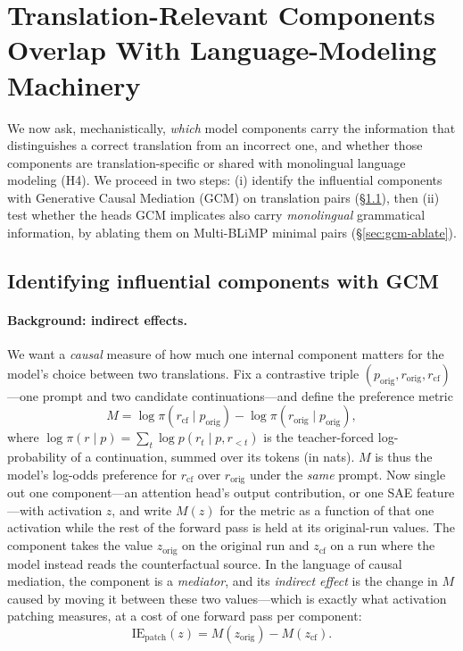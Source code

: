 \documentclass[11pt]{article}
\begin{document}
\section{Translation-Relevant Components Overlap With Language-Modeling Machinery}
\label{sec:gcm}

We now ask, mechanistically, \emph{which} model components carry the information
that distinguishes a correct translation from an incorrect one, and whether
those components are translation-specific or shared with monolingual language
modeling (H4). We proceed in two steps: (i) identify the influential components
with Generative Causal Mediation (GCM) on translation pairs
(\S\ref{sec:gcm-id}), then (ii) test whether the heads GCM implicates also carry
\emph{monolingual} grammatical information, by ablating them on Multi-BLiMP
minimal pairs (\S\ref{sec:gcm-ablate}).

\subsection{Identifying influential components with GCM}
\label{sec:gcm-id}

\paragraph{Background: indirect effects.} We want a \emph{causal} measure of how
much one internal component matters for the model's choice between two
translations. Fix a contrastive triple $(p_{\text{orig}}, r_{\text{orig}},
r_{\text{cf}})$---one prompt and two candidate continuations---and define the
preference metric
\begin{equation}
M = \log \pi(r_{\text{cf}}\mid p_{\text{orig}}) - \log \pi(r_{\text{orig}}\mid p_{\text{orig}}),
\label{eq:metric}
\end{equation}
where $\log\pi(r\mid p) = \sum_t \log p(r_t \mid p, r_{<t})$ is the
teacher-forced log-probability of a continuation, summed over its tokens (in
nats). $M$ is thus the model's log-odds preference for $r_{\text{cf}}$ over
$r_{\text{orig}}$ under the \emph{same} prompt. Now single out one component---an
attention head's output contribution, or one SAE feature---with activation $z$,
and write $M(z)$ for the metric as a function of that one activation while the
rest of the forward pass is held at its original-run values. The component takes
the value $z_{\text{orig}}$ on the original run and $z_{\text{cf}}$ on a run
where the model instead reads the counterfactual source. In the language of
causal mediation, the component is a \emph{mediator}, and its \emph{indirect
effect} is the change in $M$ caused by moving it between these two values---which
is exactly what activation patching measures, at a cost of one forward pass per
component:
\begin{equation}
\mathrm{IE}_{\text{patch}}(z) = M(z_{\text{orig}}) - M(z_{\text{cf}}).
\label{eq:patch}
\end{equation}
\end{document}
